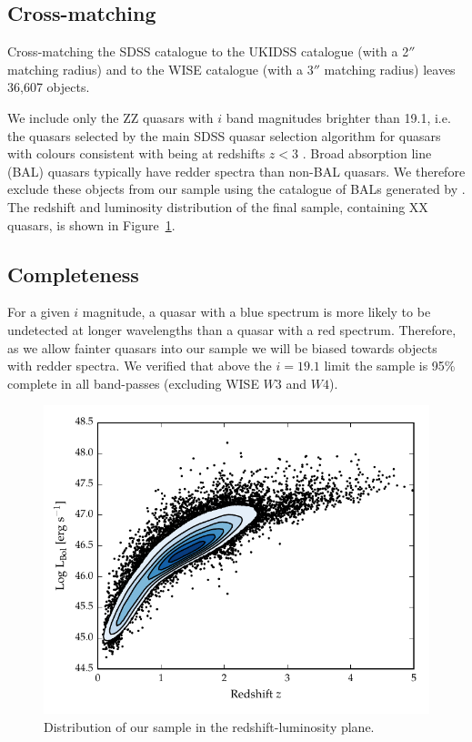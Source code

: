 \subsection{Cross-matching}

Cross-matching the SDSS catalogue to the UKIDSS catalogue (with a 2$''$ matching radius) and to the WISE catalogue (with a 3$''$ matching radius) leaves 36,607 objects. 

We include only the ZZ quasars with $i$ band magnitudes brighter than 19.1, i.e. the quasars selected by the main SDSS quasar selection algorithm for quasars with colours consistent with being at redshifts $z < 3$ \citep{richards02}. 
Broad absorption line (BAL) quasars typically have redder spectra than non-BAL quasars. 
We therefore exclude these objects from our sample using the catalogue of BALs generated by \citet{allen11}. 
The redshift and luminosity distribution of the final sample, containing XX quasars, is shown in Figure~\ref{fig:lum_z}. 

\subsection{Completeness}

For a given $i$ magnitude, a quasar with a blue spectrum is more likely to be undetected at longer wavelengths than a quasar with a red spectrum. 
Therefore, as we allow fainter quasars into our sample we will be biased towards objects with redder spectra.
We verified that above the $i=19.1$ limit the sample is 95\% complete in all band-passes (excluding WISE $W3$ and $W4$).

\begin{figure}
  \centering
  \includegraphics[width=\textwidth]{figures/chapter05/lum_z.pdf}
  \caption{Distribution of our sample in the redshift-luminosity plane. }
  \label{fig:lum_z}
\end{figure}

